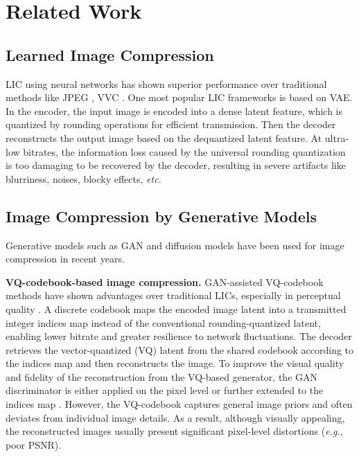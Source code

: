 \section{Related Work}
\label{sec:relate_work}
\subsection{Learned Image Compression} LIC \cite{jpegai, mlic2023, Cheng2020} using neural networks \cite{Hyperprior2018, ma2019image, li2024nas} has shown superior performance over traditional methods like JPEG \cite{JPEG2000}, VVC \cite{vvc}. One most popular LIC frameworks is based on VAE. In the encoder, the input image is encoded into a dense latent feature, which is quantized by rounding operations for efficient transmission. Then the decoder reconstructs the output image based on the dequantized latent feature. At ultra-low bitrates, the information loss caused by the universal rounding quantization is too damaging to be recovered by the decoder, resulting in severe artifacts like blurriness, noises, blocky effects, \textit{etc.}

\subsection{Image Compression by Generative Models}
Generative models such as GAN and diffusion models have been used for image compression in recent years. 

\noindent \textbf{VQ-codebook-based image compression.} 
GAN-assisted VQ-codebook methods have shown advantages over traditional LICs, especially in perceptual quality \cite{WACV2024, vqganmasiwei,muckley2023improving}. A discrete codebook maps the encoded image latent into a transmitted integer indices map instead of the conventional rounding-quantized latent, enabling lower bitrate and greater resilience to network fluctuations. The decoder retrieves the vector-quantized (VQ) latent from the shared codebook according to the indices map and then reconstructs the image. To improve the visual quality and fidelity of the reconstruction from the VQ-based generator, the GAN discriminator is either applied on the pixel level \cite{WACV2024, vqganmasiwei} or further extended to the indices map \cite{muckley2023improving}. However, the VQ-codebook captures general image priors and often deviates from individual image details. As a result, although visually appealing, the reconstructed images usually present significant pixel-level distortions (\textit{e.g.}, poor PSNR).

